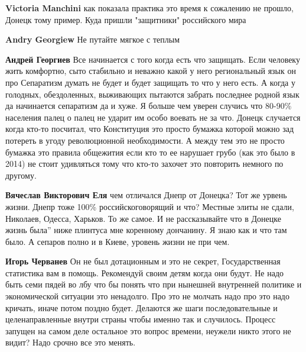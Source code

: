 \begin{itemize}
\begin{itemize}

\textbf{Victoria Manchini} как показала практика это время к сожалению не
прошло, Донецк тому пример. Куда пришли "защитники" российского мира


\textbf{Andry Georgiew} Не путайте мягкое с теплым


\textbf{Андрей Георгиев} Все начинается с того когда есть что защищать. Если
человеку жить комфортно, сыто стабильно и неважно какой у него региональный
язык он про Сепаратизм думать не будет и будет защищать то что у него есть. А
когда у голодных, обездоленных, выживающих пытаются забрать последнее родной
язык да начинается сепаратизм да и хуже. Я больше чем уверен случись что 80-90\%
населения палец о палец не ударит им особо воевать не за что. Донецк случается
когда кто-то посчитал, что Конституция это просто бумажка которой можно зад
потереть в угоду революционной необходимости. А между тем это не просто бумажка
это правила общежития если кто то ее нарушает грубо (как это было в 2014) не
стоит удивляться тому что кто-то захочет это повторить немного по другому.


\textbf{Вячеслав Викторович Еля} чем отличался Днепр от Донецка? Тот же урвень
жизни. Днепр тоже 100\% российскоговорящий и что? Местные элиты не сдали,
Николаев, Одесса, Харьков. То же самое. И не рассказывайте что в Донецке жизнь
была'' ниже плинтуса мне коренному дончанину. Я знаю как и что там было. А
сепаров полно и в Киеве, уровень жизни не при чем.


\textbf{Игорь Черванев} Он не был дотационным и это не секрет, Государственная
статистика вам в помощь. Рекомендуй своим детям когда они будут. Не надо быть
семи пядей во лбу что бы понять что при нынешней внутренней политике и
экономической ситуации это ненадолго. Про это не молчать надо про это надо
кричать, иначе потом поздно будет. Делаются же шаги последовательные и
целенаправленные внутри страны чтобы именно так и случилось. Процесс запущен на
самом деле остальное это вопрос времени, неужели никто этого не видит? Надо
срочно все это менять.


\end{itemize}
\end{itemize}
